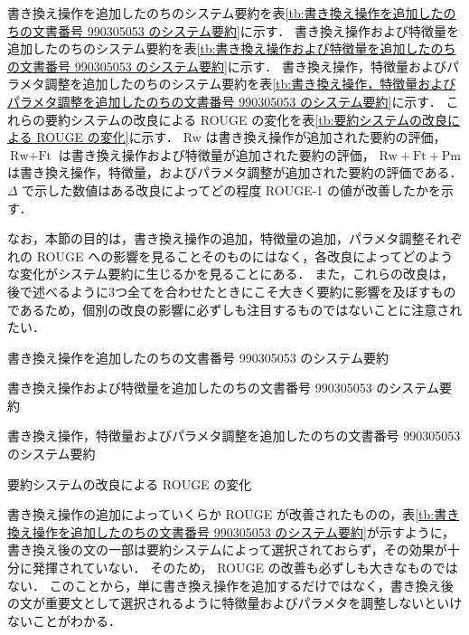 書き換え操作を追加したのちのシステム要約を表\ref{tb:書き換え操作を追加したのちの文書番号 990305053 のシステム要約}に示す．
書き換え操作および特徴量を追加したのちのシステム要約を表\ref{tb:書き換え操作および特徴量を追加したのちの文書番号 990305053 のシステム要約}に示す．
書き換え操作，特徴量およびパラメタ調整を追加したのちのシステム要約を表\ref{tb:書き換え操作，特徴量およびパラメタ調整を追加したのちの文書番号 990305053 のシステム要約}に示す．
これらの要約システムの改良による ROUGE の変化を表\ref{tb:要約システムの改良による ROUGE の変化}に示す．
Rw は書き換え操作が追加された要約の評価，
$\text{Rw} + \text{Ft}$ は書き換え操作および特徴量が追加された要約の評価，
$\text{Rw} + \text{Ft} + \text{Pm}$ は書き換え操作，特徴量，およびパラメタ調整が追加された要約の評価である．
$\Delta$ で示した数値はある改良によってどの程度 ROUGE-1 の値が改善したかを示す．

なお，本節の目的は，書き換え操作の追加，特徴量の追加，パラメタ調整それぞれの ROUGE への影響を見ることそのものにはなく，各改良によってどのような変化がシステム要約に生じるかを見ることにある．
また，これらの改良は，後で述べるように3つ全てを合わせたときにこそ大きく要約に影響を及ぼすものであるため，個別の改良の影響に必ずしも注目するものではないことに注意されたい．

\begin{table}[p]
\caption{書き換え操作を追加したのちの文書番号 990305053 のシステム要約}
\label{tb:書き換え操作を追加したのちの文書番号 990305053 のシステム要約}

\end{table}
\begin{table}[p]
\caption{書き換え操作および特徴量を追加したのちの文書番号 990305053 のシステム要約}
\label{tb:書き換え操作および特徴量を追加したのちの文書番号 990305053 のシステム要約}

\end{table}

\begin{table}[t]
\caption{書き換え操作，特徴量およびパラメタ調整を追加したのちの文書番号 990305053 のシステム要約}
\label{tb:書き換え操作，特徴量およびパラメタ調整を追加したのちの文書番号 990305053 のシステム要約}

\end{table}
\begin{table}[t]
\caption{要約システムの改良による ROUGE の変化}
\label{tb:要約システムの改良による ROUGE の変化}

\end{table}



書き換え操作の追加によっていくらか ROUGE が改善されたものの，表\ref{tb:書き換え操作を追加したのちの文書番号 990305053 のシステム要約}が示すように，書き換え後の文の一部は要約システムによって選択されておらず，その効果が十分に発揮されていない．
そのため， ROUGE の改善も必ずしも大きなものではない．
このことから，単に書き換え操作を追加するだけではなく，書き換え後の文が重要文として選択されるように特徴量およびパラメタを調整しないといけないことがわかる．

